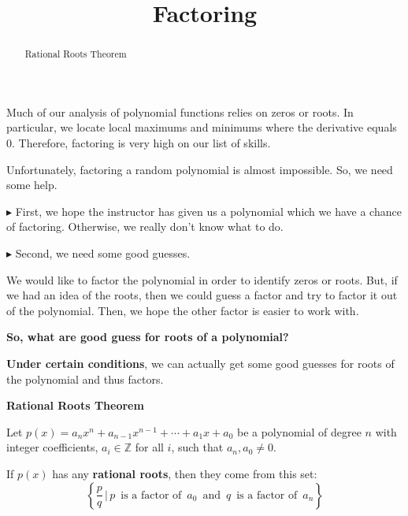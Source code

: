 \documentclass{ximera}
\title{Factoring}
\begin{document}
\begin{abstract}
Rational Roots Theorem
\end{abstract}
\maketitle




Much of our analysis of polynomial functions relies on zeros or roots. In particular, we locate local maximums and minimums where the derivative equals $0$.  Therefore, factoring is very high on our list of skills. 

Unfortunately, factoring a random polynomial is almost impossible.  So, we need some help.


$\blacktriangleright$ First, we hope the instructor has given us a polynomial which we have a chance of factoring.  Otherwise, we really don't know what to do. 




$\blacktriangleright$ Second, we need some good guesses. 


We would like to factor the polynomial in order to identify zeros or roots.  But, if we had an idea of the roots, then we could guess a factor and try to factor it out of the polynomial. Then, we hope the other factor is easier to work with.

\begin{center}
\textbf{\textcolor{red!70!black}{So, what are good guess for roots of a polynomial?}}
\end{center}


\textbf{\textcolor{purple!85!blue}{Under certain conditions}}, we can actually get some good guesses for roots of the polynomial and thus factors.






\begin{theorem} \textbf{\textcolor{-red!75!green}{Rational Roots Theorem}} 



Let $p(x) = a_n x^n + a_{n-1} x^{n-1} + \cdots + a_1 x + a_0$ be a polynomial of degree $n$ with integer coefficients, $a_i \in \mathbb{Z}$ for all $i$, such that $a_n, a_0 \ne 0$.

If $p(x)$ has any \textbf{rational roots}, then they come from this set: 
\[
\left\{ \frac{p}{q} \, | \, p \, \text{ is a factor of } \, a_0 \, \text{ and } \, q \, \text{ is a factor of } \, a_n  \right\}
\]



\end{theorem}
\end{document}
